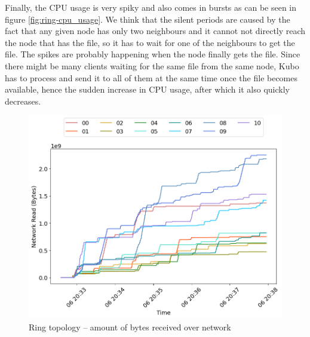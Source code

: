 Finally, the CPU usage is very spiky and also comes in bursts as can be seen in
figure \ref{fig:ring-cpu_usage}. We think that the silent periods are caused by
the fact that any given node has only two neighbours and it cannot not directly
reach the node that has the file, so it has to wait for one of the neighbours
to get the file. The spikes are probably happening when the node finally gets
the file. Since there might be many clients waiting for the same file from the
same node, Kubo has to process and send it to all of them at the same time once
the file becomes available, hence the sudden increase in CPU usage, after which
it also quickly decreases.

\begin{minipage}{0.5\linewidth}
\begin{figure}[H]
\captionsetup{justification=centering,width=0.8\linewidth}
\includegraphics[width=\linewidth]{figures/ring/net_read.png}
\caption{Ring topology -- amount of bytes received over network}
\label{fig:ring-net_read}
\end{figure}
\end{minipage}

